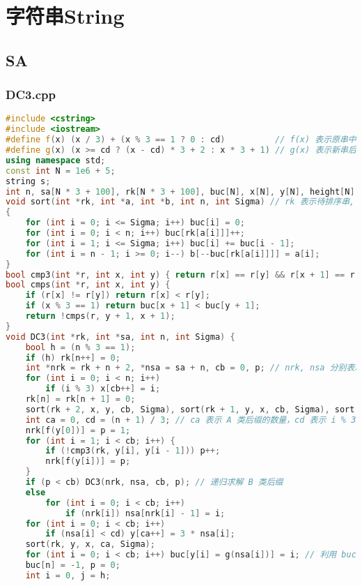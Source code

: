 \documentclass[9pt, a4paper, oneside]{book}
\begin{document}
\chapter{字符串String}
\section{SA}
\subsection{DC3.cpp}
\begin{lstlisting}[language={C++}]
#include <cstring>
#include <iostream>
#define f(x) (x / 3) + (x % 3 == 1 ? 0 : cd)          // f(x) 表示原串中后缀 x 在新串中的位置
#define g(x) (x >= cd ? (x - cd) * 3 + 2 : x * 3 + 1) // g(x) 表示新串后缀 x  在原串中的位置
using namespace std;
const int N = 1e6 + 5;
string s;
int n, sa[N * 3 + 100], rk[N * 3 + 100], buc[N], x[N], y[N], height[N];
void sort(int *rk, int *a, int *b, int n, int Sigma) // rk 表示待排序串, a 表示指标集, b 表示排序后的指标顺序
{
    for (int i = 0; i <= Sigma; i++) buc[i] = 0;
    for (int i = 0; i < n; i++) buc[rk[a[i]]]++;
    for (int i = 1; i <= Sigma; i++) buc[i] += buc[i - 1];
    for (int i = n - 1; i >= 0; i--) b[--buc[rk[a[i]]]] = a[i];
}
bool cmp3(int *r, int x, int y) { return r[x] == r[y] && r[x + 1] == r[y + 1] && r[x + 2] == r[y + 2]; }
bool cmps(int *r, int x, int y) {
    if (r[x] != r[y]) return r[x] < r[y];
    if (x % 3 == 1) return buc[x + 1] < buc[y + 1];
    return !cmps(r, y + 1, x + 1);
}
void DC3(int *rk, int *sa, int n, int Sigma) {
    bool h = (n % 3 == 1);
    if (h) rk[n++] = 0;
    int *nrk = rk + n + 2, *nsa = sa + n, cb = 0, p; // nrk, nsa 分别表示新的 rk 和 sa, cb 表示 B 类后缀的数量
    for (int i = 0; i < n; i++)
        if (i % 3) x[cb++] = i;
    rk[n] = rk[n + 1] = 0;
    sort(rk + 2, x, y, cb, Sigma), sort(rk + 1, y, x, cb, Sigma), sort(rk, x, y, cb, Sigma); // 指标顺序存在了 y 中
    int ca = 0, cd = (n + 1) / 3; // ca 表示 A 类后缀的数量，cd 表示 i % 3 = 1 的后缀的数量
    nrk[f(y[0])] = p = 1;
    for (int i = 1; i < cb; i++) {
        if (!cmp3(rk, y[i], y[i - 1])) p++;
        nrk[f(y[i])] = p;
    }
    if (p < cb) DC3(nrk, nsa, cb, p); // 递归求解 B 类后缀
    else
        for (int i = 0; i < cb; i++)
            if (nrk[i]) nsa[nrk[i] - 1] = i;
    for (int i = 0; i < cb; i++)
        if (nsa[i] < cd) y[ca++] = 3 * nsa[i];
    sort(rk, y, x, ca, Sigma);
    for (int i = 0; i < cb; i++) buc[y[i] = g(nsa[i])] = i; // 利用 buc 存 B 类后缀的排名
    buc[n] = -1, p = 0;
    int i = 0, j = h;

\end{lstlisting}
\end{document}
